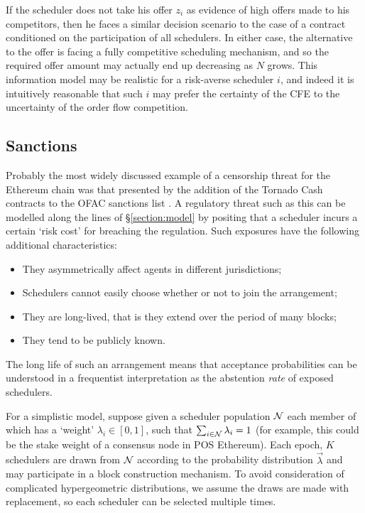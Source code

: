 If the scheduler does not take his offer $z_i$ as evidence of high offers made to his competitors, then he faces a similar decision scenario to the case of a contract conditioned on the participation of all schedulers.
%
In either case, the alternative to the offer is facing a fully competitive scheduling mechanism, and so the required offer amount may actually end up decreasing as $N$ grows.
%
This information model may be realistic for a risk-averse scheduler $i$, and indeed it is intuitively reasonable that such $i$ may prefer the certainty of the CFE to the uncertainty of the order flow competition.





\subsection{Sanctions}
\label{section:sanctions}
%
Probably the most widely discussed example of a censorship threat for the Ethereum chain was that presented by the addition of the Tornado Cash contracts to the OFAC sanctions list \cite{wright2022defi}.
%
A regulatory threat such as this can be modelled along the lines of \S\ref{section:model} by positing that a scheduler incurs a certain `risk cost' for breaching the regulation.
%
Such exposures have the following additional characteristics:
\begin{itemize}
  \item They asymmetrically affect agents in different jurisdictions;
  \item Schedulers cannot easily choose whether or not to join the arrangement;
  \item They are long-lived, that is they extend over the period of many blocks;
  \item They tend to be publicly known.
\end{itemize}
%
The long life of such an arrangement means that acceptance probabilities can be understood in a frequentist interpretation as the abstention \emph{rate} of exposed schedulers.

For a simplistic model, suppose given a scheduler population $\mathcal{N}$ each member of which has a `weight' $\lambda_i\in[0,1]$, such that $\sum_{i\in\mathcal{N}}\lambda_i=1$ (for example, this could be the stake weight of a consensus node in POS Ethereum).
%
Each epoch, $K$ schedulers are drawn from $\mathcal{N}$ according to the probability distribution $\vec{\lambda}$ and may participate in a block construction mechanism.
%
To avoid consideration of complicated hypergeometric distributions, we assume the draws are made with replacement, so each scheduler can be selected multiple times.

